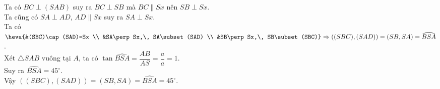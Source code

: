 \begin{ex}
{\begin{enumerate}
			Ta có $BC\perp (SAB)$ suy ra $BC\perp SB$ mà $BC\parallel Sx$ nên $SB\perp Sx$. \\
			Ta cũng có $SA\perp AD$, $AD\parallel Sx$ suy ra $SA\perp Sx$. \\
			Ta có $\heva{&(SBC)\cap (SAD)=Sx \\ &SA\perp Sx,\, SA\subset (SAD) \\ &SB\perp Sx,\, SB\subset (SBC)}\Rightarrow ((SBC),(SAD)) = (SB,SA) = \widehat{BSA}$. \\
			Xét $\triangle SAB$ vuông tại $A$, ta có 
			$\tan\widehat{BSA} = \dfrac{AB}{AS} = \dfrac{a}{a} = 1$. \\
			Suy ra $\widehat{BSA} = 45^\circ$. \\
			Vậy $((SBC),(SAD)) = (SB,SA) = \widehat{BSA}=45^\circ$.
		\end{enumerate}
	}
\end{ex}


